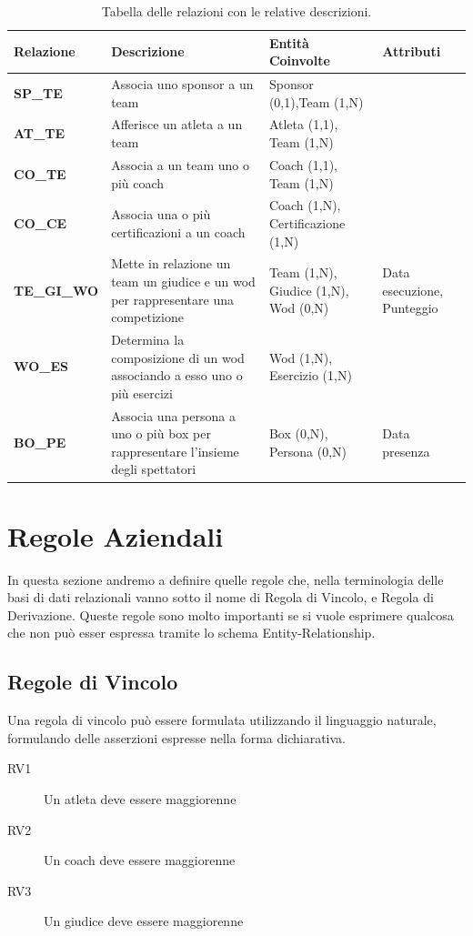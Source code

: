 \documentclass[12pt,a4paper]{article}
\begin{document}
\begin{table}[H]
\scriptsize
\centering
\caption[Entità]{Tabella delle relazioni con le relative descrizioni.}
\begin{tabularx}{\textwidth}{lXXl}
\toprule
Relazione & Descrizione & Entità Coinvolte & Attributi \\
\midrule
\textbf{SP\_TE} & Associa uno sponsor a un team & Sponsor (0,1),Team (1,N) &  \\
\midrule
\textbf{AT\_TE} & Afferisce un atleta a un team & Atleta (1,1), Team (1,N) & \\
\midrule
\textbf{CO\_TE} & Associa a un team uno o più coach & Coach (1,1), Team (1,N) & \\
\midrule
\textbf{CO\_CE} & Associa una o più certificazioni a un coach & Coach (1,N), Certificazione (1,N) & \\
\midrule
\textbf{TE\_GI\_WO} & Mette in relazione un team un giudice e un wod per rappresentare una competizione & Team (1,N), Giudice (1,N), Wod (0,N) & Data esecuzione, Punteggio \\
\midrule
\textbf{WO\_ES} & Determina la composizione di un wod associando a esso uno o più esercizi & Wod (1,N), Esercizio (1,N) & \\
\midrule
\textbf{BO\_PE} & Associa una persona a uno o più box per rappresentare l'insieme degli spettatori & Box (0,N), Persona (0,N) & Data presenza \\
\bottomrule
\end{tabularx}
\end{table}

\newpage
\section{Regole Aziendali}
In questa sezione andremo a definire quelle regole che, nella terminologia delle basi di dati relazionali vanno sotto il nome di Regola di Vincolo, e Regola di Derivazione. Queste regole sono molto importanti se si vuole esprimere qualcosa che non può esser espressa tramite lo schema Entity-Relationship.

\subsection{Regole di Vincolo}
Una regola di vincolo può essere formulata utilizzando il linguaggio naturale, formulando delle asserzioni espresse nella forma dichiarativa.
\begin{description}
	\item[RV1] Un atleta deve essere maggiorenne
	\item[RV2] Un coach deve essere maggiorenne
	\item[RV3] Un giudice deve essere maggiorenne
\end{description}
\end{document}
